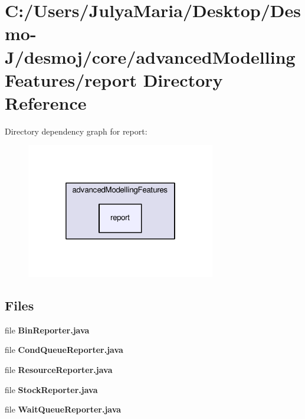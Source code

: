 \section{C\-:/\-Users/\-Julya\-Maria/\-Desktop/\-Desmo-\/\-J/desmoj/core/advanced\-Modelling\-Features/report Directory Reference}
\label{dir_b61db3af9f95e340f1405ea7fb07552d}
Directory dependency graph for report\-:
\nopagebreak
\begin{figure}[H]
\begin{center}
\leavevmode
\includegraphics[width=234pt]{dir_b61db3af9f95e340f1405ea7fb07552d_dep}
\end{center}
\end{figure}
\subsection*{Files}
\begin{DoxyCompactItemize}
\item 
file {\bfseries Bin\-Reporter.\-java}
\item 
file {\bfseries Cond\-Queue\-Reporter.\-java}
\item 
file {\bfseries Resource\-Reporter.\-java}
\item 
file {\bfseries Stock\-Reporter.\-java}
\item 
file {\bfseries Wait\-Queue\-Reporter.\-java}
\end{DoxyCompactItemize}
